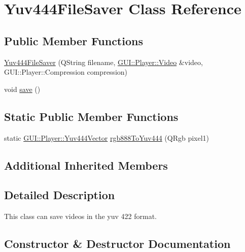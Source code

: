 \hypertarget{classGUI_1_1Player_1_1Yuv444FileSaver}{}\section{Yuv444\+File\+Saver Class Reference}
\label{classGUI_1_1Player_1_1Yuv444FileSaver}
\subsection*{Public Member Functions}
\begin{DoxyCompactItemize}
\item 
\hyperlink{classGUI_1_1Player_1_1Yuv444FileSaver_ae27303f3146862a13c63dc84682fae24}{Yuv444\+File\+Saver} (Q\+String filename, \hyperlink{classGUI_1_1Player_1_1Video}{G\+U\+I\+::\+Player\+::\+Video} \&video, G\+U\+I\+::\+Player\+::\+Compression compression)
\item 
void \hyperlink{classGUI_1_1Player_1_1Yuv444FileSaver_aae2c382151ef7c9aa913361172b30db6}{save} ()
\end{DoxyCompactItemize}
\subsection*{Static Public Member Functions}
\begin{DoxyCompactItemize}
\item 
static \hyperlink{classGUI_1_1Player_1_1Yuv444Vector}{G\+U\+I\+::\+Player\+::\+Yuv444\+Vector} \hyperlink{classGUI_1_1Player_1_1Yuv444FileSaver_afb9ea76f3b43c202a0b45d0806c4e719}{rgb888\+To\+Yuv444} (Q\+Rgb pixel1)
\end{DoxyCompactItemize}
\subsection*{Additional Inherited Members}


\subsection{Detailed Description}
This class can save videos in the yuv 422 format. 

\subsection{Constructor \& Destructor Documentation}
\hypertarget{classGUI_1_1Player_1_1Yuv444FileSaver_ae27303f3146862a13c63dc84682fae24}{}
